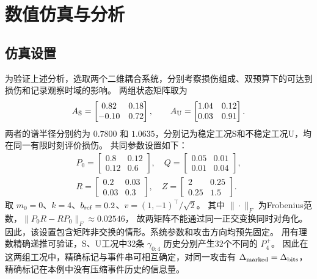 \section{数值仿真与分析}
\label{sec:numerical}


\subsection{仿真设置}
为验证上述分析，选取两个二维耦合系统，分别考察损伤组成、双预算下的可达到损伤和记录观察时域的影响。
两组状态矩阵取为
\begin{equation}
 A_{\rm S}=\begin{bmatrix}0.82&0.18\\-0.10&0.72\end{bmatrix},\qquad
 A_{\rm U}=\begin{bmatrix}1.04&0.12\\0.03&0.91\end{bmatrix}.
\end{equation}
两者的谱半径分别约为 $0.7800$ 和 $1.0635$，分别记为稳定工况S和不稳定工况U，均在同一有限时刻评价损伤。
共同参数设置如下：
\begin{equation}
 \begin{gathered}
 P_0=\begin{bmatrix}0.8&0.12\\0.12&0.6\end{bmatrix},\quad
 Q=\begin{bmatrix}0.05&0.01\\0.01&0.04\end{bmatrix},\\
 R=\begin{bmatrix}0.2&0.03\\0.03&0.3\end{bmatrix},\quad
 Z=\begin{bmatrix}2&0.25\\0.25&1.5\end{bmatrix}.
\end{gathered}
 \label{eq:2d-parameters}
\end{equation}
取 $m_0=0$、$k=4$、$b_{\rm ref}=0.2$、$v=(1,-1)^\top/\sqrt2$。
其中 $\|\cdot\|_F$ 为Frobenius范数，$\|P_0R-RP_0\|_F\approx0.02546$，
故两矩阵不能通过同一正交变换同时对角化。
因此，该设置包含矩阵非交换的情形。系统参数和攻击方向均预先固定。
用有理数精确递推可验证，S、U工况中32条 $\gamma_{0:4}$ 历史分别产生32个不同的 $P_4^+$。
因此在这两组工况中，精确标记与事件串可相互确定，对同一攻击有
$\Delta_{\rm marked}=\Delta_{\rm bits}$，精确标记在本例中没有压缩事件历史的信息量。

